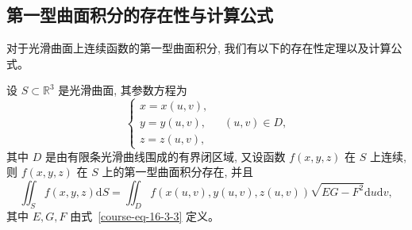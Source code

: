 \documentclass[UTF8,12pt,a4paper,fontset=fandol]{ctexart}
\begin{document}
\subsection{第一型曲面积分的存在性与计算公式}

对于光滑曲面上连续函数的第一型曲面积分, 我们有以下的存在性定理以及计算公式。

\begin{theorem}\label{course-theorem-16-3-2}\quad 设 $S\subset\mathbb R^3$ 是光滑曲面, 其参数方程为
\[
  \begin{cases}
    x=x(u,v),\\
    y=y(u,v),\\
    z=z(u,v),
  \end{cases}
  \quad (u,v)\in D,
\]
其中 $D$ 是由有限条光滑曲线围成的有界闭区域, 又设函数 $f(x,y,z)$ 在 $S$ 上连续, 则 $f(x,y,z)$ 在 $S$ 上的第一型曲面积分存在, 并且
\begin{equation}
  \iint_S f(x,y,z)\mathrm dS
  =\iint_D f(x(u,v),y(u,v),z(u,v))\sqrt{EG-F^2}\mathrm du\mathrm dv,
  \label{course-eq-16-3-4}
\end{equation}
其中 $E,G,F$ 由式~\eqref{course-eq-16-3-3}  定义。

\end{theorem}
\end{document}
